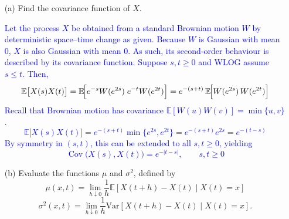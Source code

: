 \documentclass{article}
\begin{document}
\begin{enumerate}
    \item[(a)] Find the covariance function of $X$.

    \textcolor{blue}{
Let the process $X$ be obtained from a standard Brownian motion $W$ by deterministic space–time change as given.
Because $W$ is Gaussian with mean $0$, $X$ is also Gaussian with mean $0$. As such, its second‑order behaviour is described by its covariance function. Suppose $s,t\ge 0$ and WLOG assume $s\le t$. Then,
$$
\mathbb{E}\bigl[X(s)X(t)\bigr]
=\mathbb{E}\!\Bigl[e^{-s}W(e^{2s})\;e^{-t}W(e^{2t})\Bigr]
=e^{-(s+t)}\,
\mathbb{E}\!\Bigl[W(e^{2s})\,W(e^{2t})\Bigr]
$$
Recall that Brownian motion has covariance $\mathbb{E}[W(u)W(v)]=\min\{u,v\}$.
$$
\mathbb{E}\bigl[X(s)X(t)\bigr]
=e^{-(s+t)}\min\!\bigl\{e^{2s},e^{2t}\bigr\}
=e^{-(s+t)}e^{2s}
=e^{-(t-s)}
$$
By symmetry in $(s,t)$, this can be extended to all $s,t\ge 0$, yielding
$$
\operatorname{Cov}\bigl(X(s),X(t)\bigr)=e^{-|t-s|},\qquad s,t\ge 0
$$
    }

    \item[(b)] Evaluate the functions $\mu$ and $\sigma^2$, defined by
    \[
    \mu(x,t) = \lim_{h \downarrow 0} \frac{1}{h} \mathbb{E}[X(t+h) - X(t) \mid X(t) = x]
    \]
    \[
    \sigma^2(x,t) = \lim_{h \downarrow 0} \frac{1}{h} \mathrm{Var}[X(t+h) - X(t) \mid X(t) = x].
    \]


\end{enumerate}
\end{document}

